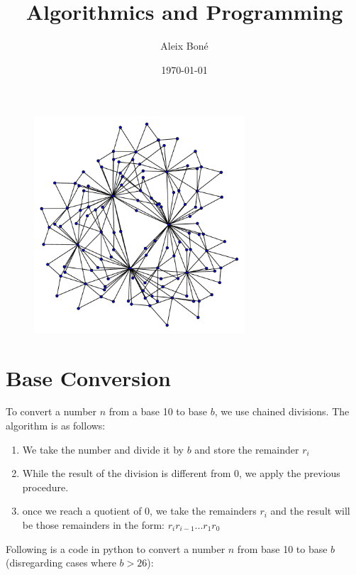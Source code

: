 \documentclass[11pt,twoside]{article}
\title{
	  Algorithmics and Programming
}
\author{
Aleix Boné
}
\date{\today}
\theoremstyle{defi}
\begin{document}
\clearpage\maketitle
\thispagestyle{empty}
\vspace{2cm}
\begin{center}
\begin{figure}[hb]
\centerline{\includegraphics[width=0.7\textwidth]{src/DGMG.pdf}}
\end{figure}
\end{center}

\newpage
\mbox{}
\thispagestyle{empty}
\clearpage

\newpage
{}
\tableofcontents
\newpage

\section{Base Conversion}

To convert a number $n$ from a base 10 to base $b$, we use chained divisions. The algorithm is as follows:
\begin{enumerate}
\item We take the number and divide it by $b$ and store the remainder $r_i$
	\item While the result of the division is different from 0, we apply the previous procedure.
	\item once we reach a quotient of 0, we take the remainders $r_i$ and the result will be those remainders in the form: $r_ir_{i-1}...r_1r_0$
\end{enumerate}

Following is a code in python to convert a number $n$ from base 10 to base $b$ (disregarding cases where $b>26$):
\end{document}
